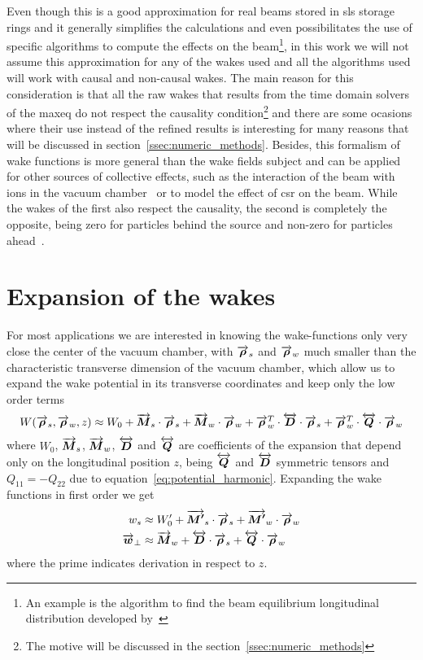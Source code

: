     Even though this is a good approximation for real beams stored in \gls{sls} storage rings and it generally simplifies the calculations and even possibilitates the use of specific algorithms to compute the effects on the beam\footnote{An example is the algorithm to find the beam equilibrium longitudinal distribution developed by~}, in this work we will not assume this approximation for any of the wakes used and all the algorithms used will work with causal and non-causal wakes. The main reason for this consideration is that all the raw wakes that results from the time domain solvers of the \gls{maxeq} do not respect the causality condition\footnote{The motive will be discussed in the section~\ref{ssec:numeric_methods}} and there are some ocasions where their use instead of the refined results is interesting for many reasons that will be discussed in section~\ref{ssec:numeric_methods}. Besides, this formalism of wake functions is more general than the wake fields subject and can be applied for other sources of collective effects, such as the interaction of the beam with ions in the vacuum chamber~\cite{Wang2013a} or to model the effect of \gls{csr} on the beam. While the wakes of the first also respect the causality, the second is completely the opposite, being zero for particles behind the source and non-zero for particles ahead~\cite{Derbenev1995}.

\section{Expansion of the wakes}

    For most applications we are interested in knowing the wake-functions only very close the center of the vacuum chamber, with $\overrightarrow{\boldsymbol{\rho}}_s$ and $\overrightarrow{\boldsymbol{\rho}}_w$ much smaller than the characteristic transverse dimension of the vacuum chamber, which allow us to expand the wake potential in its transverse coordinates and keep only the low order terms
    \begin{align}\label{eq:wake_potential_expansion}
      	W(\overrightarrow{\boldsymbol{\rho}}_s, \overrightarrow{\boldsymbol{\rho}}_w, z) \approx W_0 +
	  	\overrightarrow{\boldsymbol{M}}_s\cdot\overrightarrow{\boldsymbol{\rho}}_s + \overrightarrow{\boldsymbol{M}}_w\cdot\overrightarrow{\boldsymbol{\rho}}_w +
	  	\overrightarrow{\boldsymbol{\rho}}_w^T\cdot\overleftrightarrow{\boldsymbol{D}}\cdot\overrightarrow{\boldsymbol{\rho}}_s +
	  	\overrightarrow{\boldsymbol{\rho}}_w^T\cdot\overleftrightarrow{\boldsymbol{Q}}\cdot\overrightarrow{\boldsymbol{\rho}}_w
    \end{align}
    where $W_0$, $\overrightarrow{\boldsymbol{M}}_s$, $\overrightarrow{\boldsymbol{M}}_w$, $\overleftrightarrow{\boldsymbol{D}}$ and $\overleftrightarrow{\boldsymbol{Q}}$ are coefficients of the expansion that depend only on the longitudinal position $z$, being $\overleftrightarrow{\boldsymbol{Q}}$ and $\overleftrightarrow{\boldsymbol{D}}$ symmetric tensors and $Q_{11}=-Q_{22}$ due to equation~\eqref{eq:potential_harmonic}. Expanding the wake functions in first order we get
    \begin{align}\label{eq:wake_functions_expansion}
      	w_s &\approx W'_0 + \overrightarrow{\boldsymbol{M'}}_s\cdot\overrightarrow{\boldsymbol{\rho}}_s + \overrightarrow{\boldsymbol{M'}}_w\cdot\overrightarrow{\boldsymbol{\rho}}_w \\
	  	\overrightarrow{\boldsymbol{w}}_\perp &\approx \overrightarrow{\boldsymbol{M}}_w + \overleftrightarrow{\boldsymbol{D}}\cdot\overrightarrow{\boldsymbol{\rho}}_s + \overleftrightarrow{\boldsymbol{Q}}\cdot\overrightarrow{\boldsymbol{\rho}}_w
    \end{align}
    where the prime indicates derivation in respect to $z$.

